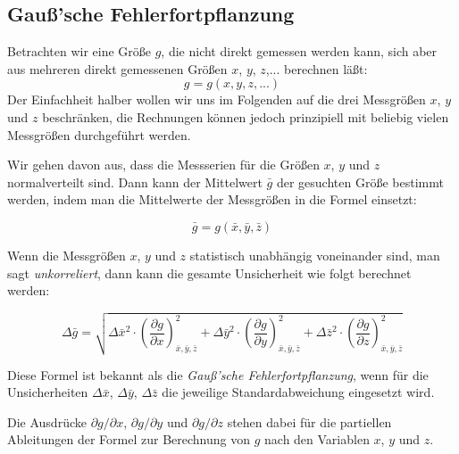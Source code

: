 \subsection{Gauß'sche Fehlerfortpflanzung}

Betrachten wir eine Größe $g$, die nicht direkt gemessen werden kann, sich aber aus mehreren direkt gemessenen Größen $x$, $y$, $z$,... berechnen läßt:
\begin{equation}
	g = g(x,y,z,...)
\end{equation}
Der Einfachheit halber wollen wir uns im Folgenden auf die drei Messgrößen $x$, $y$ und $z$ beschränken, die Rechnungen können jedoch prinzipiell mit beliebig vielen Messgrößen durchgeführt werden.

Wir gehen davon aus, dass die Messserien für die Größen $x$, $y$ und $z$ normalverteilt sind. Dann kann der Mittelwert $\bar{g}$ der gesuchten Größe bestimmt werden, indem man die Mittelwerte der Messgrößen in die Formel einsetzt:
\begin{important}
	\begin{equation}
		\bar{g} = g(\bar{x},\bar{y},\bar{z})
	\end{equation}
\end{important}

Wenn die Messgrößen $x$, $y$ und $z$ statistisch unabhängig voneinander sind, man sagt \textit{unkorreliert}, dann kann die gesamte Unsicherheit wie folgt berechnet werden:
\begin{important}
	\begin{equation}
		\Delta\bar{g} = \sqrt{\Delta\bar{x}^2 \cdot \left(\frac{\partial g}{\partial x} \right)^2_{\bar{x},\bar{y},\bar{z}} + \Delta\bar{y}^2 \cdot \left(\frac{\partial g}{\partial y} \right)^2_{\bar{x},\bar{y},\bar{z}} + \Delta\bar{z}^2 \cdot \left(\frac{\partial g}{\partial z} \right)^2_{\bar{x},\bar{y},\bar{z}}}
	\end{equation}
\end{important}

Diese Formel ist bekannt als die \textit{Gauß'sche Fehlerfortpflanzung}, wenn für die Unsicherheiten $\Delta\bar{x}$, $\Delta\bar{y}$, $\Delta\bar{z}$ die jeweilige Standardabweichung eingesetzt wird.

Die Ausdrücke $\partial g/\partial x$, $\partial g/\partial y$ und $\partial g/\partial z$ stehen dabei für die partiellen Ableitungen der Formel zur Berechnung von $g$ nach den Variablen $x$, $y$ und $z$.

